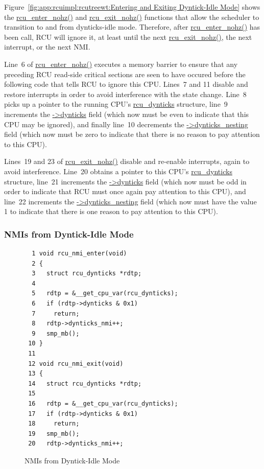 Figure~\ref{fig:app:rcuimpl:rcutreewt:Entering and Exiting Dyntick-Idle Mode}
shows the \url{rcu_enter_nohz()} and \url{rcu_exit_nohz()} functions
that allow the scheduler to transition to and from dynticks-idle
mode.
Therefore, after \url{rcu_enter_nohz()} has been call, RCU will ignore
it, at least until the next \url{rcu_exit_nohz()}, the next interrupt,
or the next NMI.

Line~6 of \url{rcu_enter_nohz()} executes a memory barrier to ensure
that any preceding RCU read-side critical sections are seen to have
occured before the following code that tells RCU to ignore this CPU.
Lines~7 and 11 disable and restore interrupts in order to avoid
interference with the state change.
Line~8 picks up a pointer to the running CPU's \url{rcu_dynticks}
structure, line~9 increments the \url{->dynticks} field (which now
must be even to indicate that this CPU may be ignored), and finally line~10
decrements the \url{->dynticks_nesting} field (which now must be
zero to indicate that there is no reason to pay attention to this CPU).

Lines~19 and 23 of \url{rcu_exit_nohz()} disable and re-enable interrupts,
again to avoid interference.
Line~20 obtains a pointer to this CPU's \url{rcu_dynticks} structure,
line~21 increments the \url{->dynticks} field (which now must be odd
in order to indicate that RCU must once again pay attention to this
CPU), and line~22 increments the \url{->dynticks_nesting} field
(which now must have the value 1 to indicate that there is one
reason to pay attention to this CPU).

\subsubsection{NMIs from Dyntick-Idle Mode}
\label{app:rcuimpl:rcutreewt:NMIs from Dyntick-Idle Mode}

\begin{figure}[tbp]
{ \scriptsize
\begin{verbatim}
  1 void rcu_nmi_enter(void)
  2 {
  3   struct rcu_dynticks *rdtp;
  4 
  5   rdtp = &__get_cpu_var(rcu_dynticks);
  6   if (rdtp->dynticks & 0x1)
  7     return;
  8   rdtp->dynticks_nmi++;
  9   smp_mb();
 10 }
 11 
 12 void rcu_nmi_exit(void)
 13 {
 14   struct rcu_dynticks *rdtp;
 15 
 16   rdtp = &__get_cpu_var(rcu_dynticks);
 17   if (rdtp->dynticks & 0x1)
 18     return;
 19   smp_mb();
 20   rdtp->dynticks_nmi++;
\end{verbatim}
}
\caption{NMIs from Dyntick-Idle Mode}
\label{fig:app:rcuimpl:rcutreewt:NMIs from Dyntick-Idle Mode}
\end{figure}

